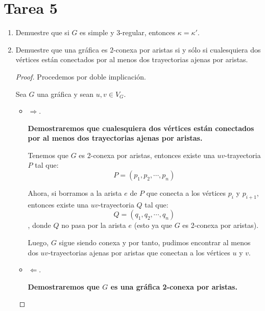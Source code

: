 \documentclass{article}
\begin{document}
    \section*{\LARGE{Tarea 5}}
    \begin{enumerate}
        \item Demuestre que si $G$ es simple y $3$-regular, entonces $\kappa =
      \kappa'$.


        \item Demuestre que una gr\'afica es $2$-conexa por aristas si y s\'olo si
        cualesquiera dos v\'ertices est\'an conectados por al menos dos trayectorias
        ajenas por aristas.

            \renewcommand\qedsymbol{QED}
            \begin{proof}
                Procedemos por doble implicación.

                Sea $G$ una gráfica y sean $u, v \in V_{G}$.

                \begin{itemize}
                    \item $\Longrightarrow$.

                        \textbf{Demostraremos que cualesquiera dos v\'ertices est\'an conectados por al menos dos trayectorias ajenas por aristas.}

                        Tenemos que $G$ es 2-conexa por aristas, entonces existe una $uv$-trayectoria $P$ tal que:
                        $$P = (p_{1}, p_{2}, \cdots, p_{n})$$

                        Ahora, si borramos a la arista $e$ de $P$ que conecta a los vértices $p_{i}$ y $p_{i+1}$, entonces existe una $uv$-trayectoria $Q$ tal que:
                        $$Q = (q_{1}, q_{2}, \cdots, q_{n})$$
                        , donde $Q$ no pasa por la arista $e$ (esto ya que $G$ es 2-conexa por aristas).

                        Luego, $G$ sigue siendo conexa y por tanto, pudimos encontrar al menos dos $uv$-trayectorias ajenas por aristas que conectan a los vértices $u$ y $v$.

                    \item $\Longleftarrow$.

                        \textbf{Demostraremos que $G$ es una gráfica 2-conexa por aristas.}


\end{itemize}
\end{proof}
\end{enumerate}
\end{document}
